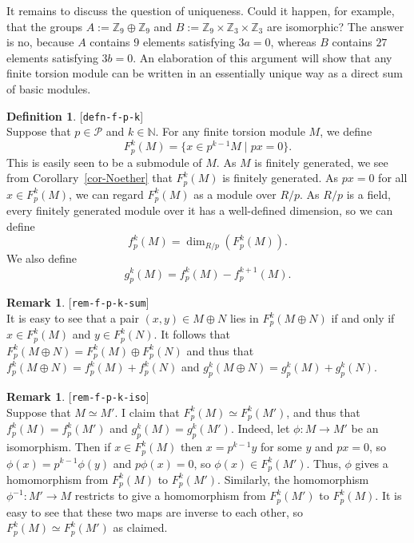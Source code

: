 \documentclass{amsart}
\newcommand{\lbl}[1]{\label{#1}\textup{[\texttt{#1}]}\ \\}
\newcommand{\lbl}{\label}
\newcommand{\N}         {{\mathbb{N}}}
\newcommand{\Z}         {{\mathbb{Z}}}
\newcommand{\tm}        {\times}
\newcommand{\xra}       {\xrightarrow}
\newcommand{\st}        {\;|\;}
\newcommand{\op}        {\oplus}
\newcommand{\CP}        {{\mathcal{P}}}
\renewcommand{\:}{\colon}
\theoremstyle{definition}
\newtheorem{remark}[theorem]{Remark}
\newtheorem{definition}[theorem]{Definition}
\begin{document}
It remains to discuss the question of uniqueness.  Could it happen,
for example, that the groups $A:=\Z_9\op\Z_9$ and
$B:=\Z_9\tm\Z_3\tm\Z_3$ are isomorphic?  The answer is no, because $A$
contains $9$ elements satisfying $3a=0$, whereas $B$ contains $27$
elements satisfying $3b=0$.  An elaboration of this argument will show
that any finite torsion module can be written in an essentially unique
way as a direct sum of basic modules.

\begin{definition}\lbl{defn-f-p-k}
 Suppose that $p\in\CP$ and $k\in\N$.  For any finite torsion module
 $M$, we define
 \[ F_p^k(M) = \{ x \in p^{k-1}M \st px=0 \}. \]
 This is easily seen to be a submodule of $M$.  As $M$ is finitely
 generated, we see from Corollary~\ref{cor-Noether} that $F_p^k(M)$
 is finitely generated.  As $px=0$ for all $x\in F_p^k(M)$, we can
 regard $F_p^k(M)$ as a module over $R/p$.  As $R/p$ is a field, every
 finitely generated module over it has a well-defined dimension, so we
 can define
 \[ f_p^k(M) = \dim_{R/p}(F_p^k(M)). \]
 We also define
 \[ g_p^k(M) = f_p^k(M) - f_p^{k+1}(M). \]
\end{definition}
\begin{remark}\lbl{rem-f-p-k-sum}
 It is easy to see that a pair $(x,y)\in M\op N$ lies in
 $F_p^k(M\op N)$ if and only if $x\in F_p^k(M)$ and $y\in F_p^k(N)$.
 It follows that $F_p^k(M\op N)=F_p^k(M)\op F_p^k(N)$ and thus that
 $f_p^k(M\op N)=f_p^k(M)+f_p^k(N)$ and
 $g_p^k(M\op N)=g_p^k(M)+g_p^k(N)$.
\end{remark}
\begin{remark}\lbl{rem-f-p-k-iso}
 Suppose that $M\simeq M'$.  I claim that $F_p^k(M)\simeq F_p^k(M')$,
 and thus that $f_p^k(M)=f_p^k(M')$ and $g_p^k(M)=g_p^k(M')$.  Indeed,
 let $\phi\:M\xra{}M'$ be an isomorphism.  Then if $x\in F_p^k(M)$
 then $x=p^{k-1}y$ for some $y$ and $px=0$, so
 $\phi(x)=p^{k-1}\phi(y)$ and $p\phi(x)=0$, so $\phi(x)\in F_p^k(M')$.
 Thus, $\phi$ gives a homomorphism from $F_p^k(M)$ to $F_p^k(M')$.
 Similarly, the homomorphism $\phi^{-1}\:M'\xra{}M$ restricts to give
 a homomorphism from $F_p^k(M')$ to $F_p^k(M)$.  It is easy to see
 that these two maps are inverse to each other, so
 $F_p^k(M)\simeq F_p^k(M')$ as claimed.
\end{remark}
\end{document}
